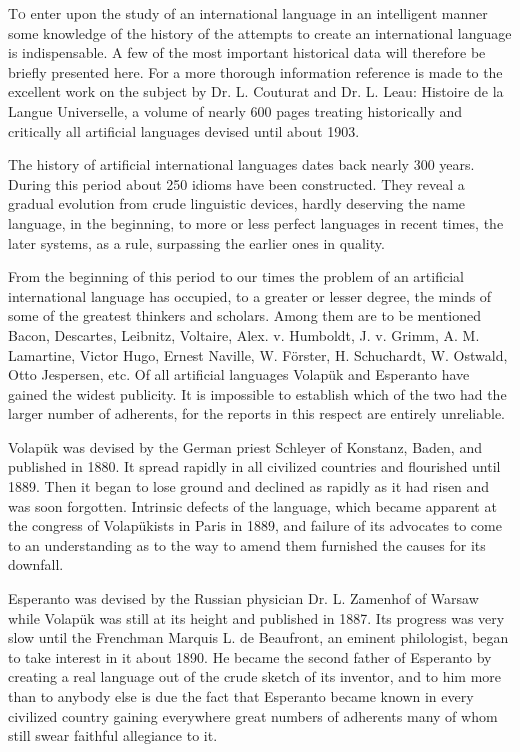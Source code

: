 \lettrine{T}{o} enter upon the study of an international language in an intelligent manner some knowledge of the history of the attempts to create an international language is indispensable. A few of the most important historical data will therefore be briefly presented here. For a more thorough information reference is made to the excellent work on the subject by Dr. L. Couturat and Dr. L. Leau: Histoire de la Langue Universelle, a volume of nearly 600 pages treating historically and critically all artificial languages devised until about 1903. 

The history of artificial international languages dates back nearly 300 years. During this period about 250 idioms have been constructed. They reveal a gradual evolution from crude linguistic devices, hardly deserving the name language, in the beginning, to more or less perfect languages in recent times, the later systems, as a rule, surpassing the earlier ones in quality. 

From the beginning of this period to our times the problem of an artificial international language has occupied, to a greater or lesser degree, the minds of some of the greatest thinkers and scholars. Among them are to be mentioned Bacon, Descartes, Leibnitz, Voltaire, Alex. v. Humboldt, J. v. Grimm, A. M. Lamartine, Victor Hugo, Ernest Naville, W. Förster, H. Schuchardt, W. Ostwald, Otto Jespersen, etc. 
Of all artificial languages Volapük and Esperanto have gained the widest publicity. It is impossible to establish which of the two had the larger number of adherents, for the reports in this respect are entirely unreliable. 

Volapük was devised by the German priest Schleyer of Konstanz, Baden, and published in 1880. It spread rapidly in all civilized countries and flourished until 1889. Then it began to lose ground and declined as rapidly as it had risen and was soon forgotten. Intrinsic defects of the language, which became apparent at the congress of Volapükists in Paris in 1889, and failure of its advocates to come to an understanding as to the way to amend them furnished the causes for its downfall. 

Esperanto was devised by the Russian physician Dr. L. Zamenhof of Warsaw while Volapük was still at its height and published in 1887. Its progress was very slow until the Frenchman Marquis L. de Beaufront, an eminent philologist, began to take interest in it about 1890. He became the second father of Esperanto by creating a real language out of the crude sketch of its inventor, and to him more than to anybody else is due the fact that Esperanto became known in every civilized country gaining everywhere great numbers of adherents many of whom still swear faithful allegiance to it. 

